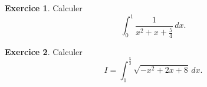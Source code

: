 \documentclass[a4paper, 11pt,openany]{article}%
\theoremstyle{plain}
\theoremstyle{definition}
\newtheorem{exo}{Exercice}
\newtheorem{sol}{Solution de l'exercice}
\theoremstyle{remark}
\begin{document}
   

\begin{exo}
Calculer
\[ \int_0^1 \frac{1}{x^2 + x + \frac{5}{4}} \, dx.\]
\end{exo}



\begin{exo}
Calculer 
\[ I = \int_1^{\frac{5}{2}} \sqrt{-x^2 + 2x + 8} \, dx.\]
\end{exo}

\end{document}
